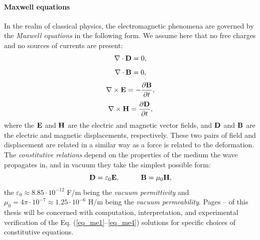 \paragraph{Maxwell equations}  %
In the realm of classical physics, the electromagnetic phenomena are governed by the \textit{Maxwell equations} in the following form.
We assume here that no free charges and no sources of currents are present: 
\begin{equation} \nabla \cdot  \mathbf{D} = 0, \label{eq_me1}\end{equation}  
\begin{equation} \nabla \cdot  \mathbf{B} = 0, \label{eq_me2}\end{equation}  
\begin{equation} \nabla \times \mathbf{E} = -\frac{\partial \mathbf{B}} {\partial t}, \label{eq_me3}\end{equation}  
\begin{equation} \nabla \times \mathbf{H} =  \frac{\partial \mathbf{D}} {\partial t}, \label{eq_me4}\end{equation}  
where the $\mathbf{E}$ and $\mathbf{H}$ are the electric and magnetic vector fields, and $\mathbf{D}$ and $\mathbf{B}$ are the electric and magnetic displacements,
 respectively. These two pairs of field and displacement are related in a similar way as a force is related to the deformation. %
 The \textit{constitutive relations} depend on the properties of the medium the wave propagates in, and in vacuum they take the simplest possible form:
\begin{equation}		\mathbf{D} = \varepsilon_0	\mathbf{E}, \quad\quad\quad						\mathbf{B} = \mu_0			\mathbf{H},				 \label{eq_ce}\end{equation}
the $\varepsilon_0 \approx 8.85\cdot10^{-12}$ F/m being the \textit{vacuum permittivity} and $\mu_0 = 4\pi \cdot 10^{-7} \approx 1.25\cdot10^{-6}$ H/m being the \textit{vacuum permeability}. 
Pages \pageref{starttext}--\pageref{endtext} of this thesis will be concerned with computation, interpretation, and experimental verification of the Eq. (\ref{eq_me1}--\ref{eq_me4}) solutions for specific choices of constitutive equations.
